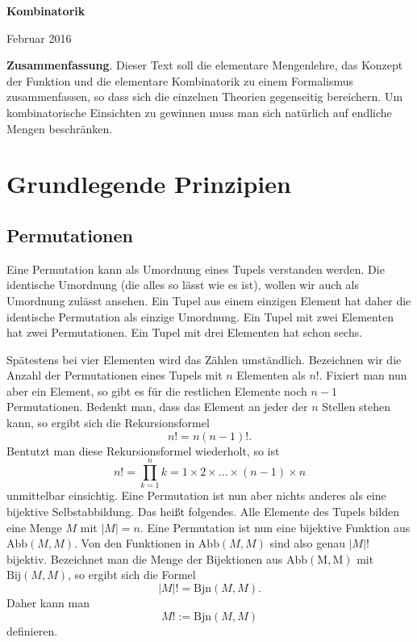 \documentclass[a4paper,12pt,fleqn]{article}
\begin{document}
\noindent
{\huge\textbf{Kombinatorik}}
\vspace{2mm}

\noindent
Februar 2016

\tableofcontents
\vspace{4mm}

\noindent
\textbf{Zusammenfassung}. Dieser Text soll die elementare
Mengenlehre, das Konzept der Funktion und die elementare
Kombinatorik zu einem Formalismus zusammenfassen, so dass sich
die einzelnen Theorien gegenseitig bereichern. Um kombinatorische
Einsichten zu gewinnen muss man sich natürlich auf endliche
Mengen beschränken.

\section{Grundlegende Prinzipien}
\subsection{Permutationen}
Eine Permutation kann als Umordnung eines Tupels verstanden
werden. Die identische Umordnung (die alles so lässt wie es ist),
wollen wir auch als Umordnung zulässt ansehen. Ein Tupel aus
einem einzigen Element hat daher die identische Permutation als
einzige Umordnung. Ein Tupel mit zwei Elementen hat zwei
Permutationen. Ein Tupel mit drei Elementen hat schon sechs.

Spätestens bei vier Elementen wird das Zählen umständlich.
Bezeichnen wir die Anzahl der Permutationen eines Tupels
mit $n$ Elementen als $n!$. Fixiert man nun aber ein Element,
so gibt es für die restlichen Elemente noch $n-1$ Permutationen.
Bedenkt man, dass das Element an jeder der $n$ Stellen stehen
kann, so ergibt sich die Rekursionsformel
\begin{equation}
n! = n(n-1)!.
\end{equation}
Bentutzt man diese Rekursionsformel wiederholt, so ist
\begin{equation}
n! = \prod_{k=1}^n k = 1\times 2\times\ldots\times(n-1)\times n
\end{equation}
unmittelbar einsichtig. Eine Permutation ist nun aber nichts
anderes als eine bijektive Selbstabbildung. Das heißt folgendes.
Alle Elemente des Tupels bilden eine Menge $M$ mit $|M|=n$.
Eine Permutation ist nun eine bijektive Funktion aus
$\mathrm{Abb}(M,M)$. Von den Funktionen in $\mathrm{Abb}(M,M)$
sind also genau $|M|!$ bijektiv. Bezeichnet man die Menge
der Bijektionen aus $\mathrm{Abb(M,M)}$ mit
$\mathrm{Bij}(M,M)$, so ergibt sich die Formel
\begin{equation}
|M|! = \mathrm{Bjn}(M,M).
\end{equation}
Daher kann man
\begin{equation}
M!:=\mathrm{Bjn}(M,M)
\end{equation}
definieren.
\end{document}

